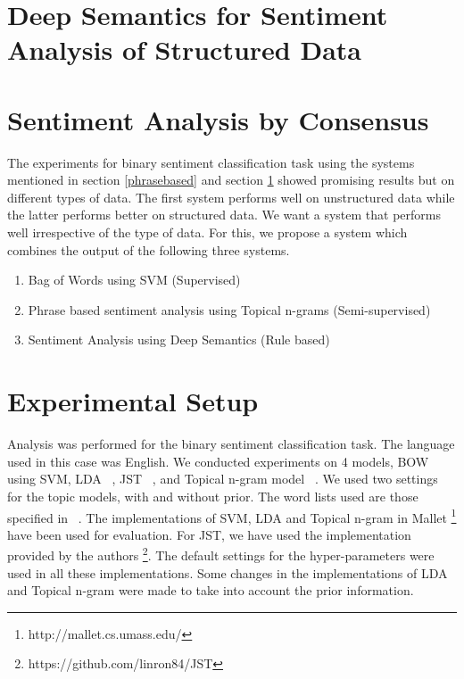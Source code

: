 \documentclass[11pt]{article}
\begin{document}
\section{Deep Semantics for Sentiment Analysis of Structured Data}\label{deep}


\section{Sentiment Analysis by Consensus}\label{consensus}

The experiments for binary sentiment classification task using the systems mentioned in section \ref{phrasebased}
and section \ref{deep} showed promising results but on different types of data. The first system performs well
on unstructured data while the latter performs better on structured data. We want a system that performs well
irrespective of the type of data. For this, we propose a system which combines the output of the following three
systems.

\begin{enumerate}
 \item Bag of Words using SVM (Supervised)
 \item Phrase based sentiment analysis using Topical n-grams (Semi-supervised)
 \item Sentiment Analysis using Deep Semantics (Rule based)
\end{enumerate}


\section{Experimental Setup}\label{experiments}

Analysis was performed for the binary sentiment classification task. The language used in this case was English.
We conducted experiments on 4 models, BOW using SVM, LDA ~\cite{blei2003latent}, JST ~\cite{lin2009joint}, and 
Topical n-gram model ~\cite{wang2007topical}. We used two settings for the topic models, with and without prior. 
The word lists used are those specified in ~\cite{liu2010sentiment}. The implementations of SVM, LDA and Topical
n-gram in Mallet \footnote{http://mallet.cs.umass.edu/} have been used for evaluation. For JST, we have used the 
implementation provided by the authors \footnote{https://github.com/linron84/JST}. The default settings for the
hyper-parameters were used in all these implementations. Some changes in the implementations of LDA and Topical
n-gram were made to take into account the prior information.
\end{document}
